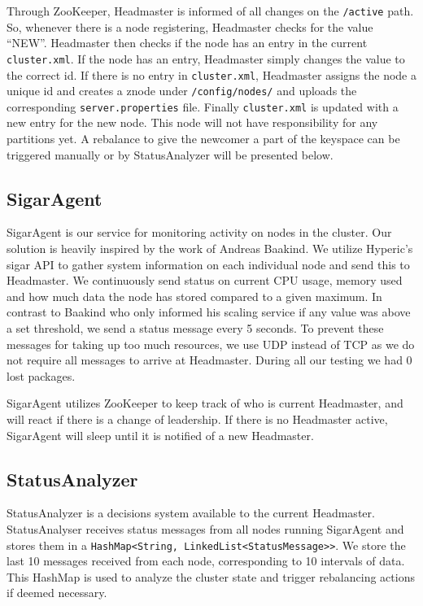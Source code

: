 Through ZooKeeper, Headmaster is informed of all changes on the \texttt{/active} path. So, whenever there is a node registering, Headmaster checks for the value ``NEW''. Headmaster then checks if the node has an entry in the current \texttt{cluster.xml}. If the node has an entry, Headmaster simply changes the value to the correct id. If there is no entry in \texttt{cluster.xml}, Headmaster assigns the node a unique id and creates a znode under \texttt{/config/nodes/} and uploads the corresponding \texttt{server.properties} file. Finally \texttt{cluster.xml} is updated with a new entry for the new node. This node will not have responsibility for any partitions yet. A rebalance to give the newcomer a part of the keyspace can be triggered manually or by StatusAnalyzer will be presented below.

\subsection{SigarAgent}
SigarAgent is our service for monitoring activity on nodes in the cluster. Our solution is heavily inspired by the work of Andreas Baakind\cite{baakind}. We utilize Hyperic's sigar API to gather system information on each individual node and send this to Headmaster. We continuously send status on current CPU usage, memory used and how much data the node has stored compared to a given maximum. In contrast to Baakind who only informed his scaling service if any value was above a set threshold, we send a status message every 5 seconds. To prevent these messages for taking up too much resources, we use UDP instead of TCP as we do not require all messages to arrive at Headmaster. During all our testing we had 0 lost packages.

SigarAgent utilizes ZooKeeper to keep track of who is current Headmaster, and will react if there is a change of leadership. If there is no Headmaster active, SigarAgent will sleep until it is notified of a new Headmaster. 

\subsection{StatusAnalyzer}
StatusAnalyzer is a decisions system available to the current Headmaster. StatusAnalyser receives status messages from all nodes running SigarAgent and stores them in a \texttt{HashMap<String, LinkedList<StatusMessage>>}. We store the last 10 messages received from each node, corresponding to 10 intervals of data. This HashMap is used to analyze the cluster state and trigger rebalancing actions if deemed necessary.

